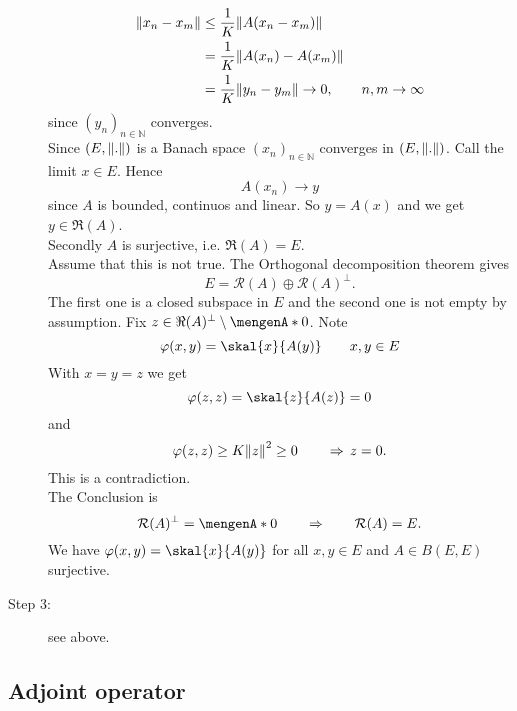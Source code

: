 \begin{beweis}
\begin{description}
		\begin{align*}
			\norm{x_n-x_m} &\leq \frac{1}{K} \norm{A(x_n-x_m)} \\
			&= \frac{1}{K} \norm{A(x_n)- A(x_m)} \\
			&= \frac{1}{K} \norm{y_n -y_m} \to 0, \qquad n,m \to \infty
		\end{align*}
		since $(y_n)_{n \in \mathbb{N}}$ converges. \\
		Since $(E, \norm{.})$ is a Banach space $(x_n)_{n \in \mathbb{N}}$ converges in $(E, \norm{.})$. Call the limit $x \in E$. Hence
		\[
			A(x_n) \to y
		\]
		since $A$ is bounded, continuos and linear. So $y = A(x)$ and we get $y \in \Re(A)$. \\
		Secondly $A$ is surjective, i.e. $\Re(A)=E$. \\
		Assume that this is not true. The Orthogonal decomposition theorem gives
		\[
			E = \mathcal{R}(A) \oplus \mathcal{R}(A)^{\perp}.
		\]
		The first one is a closed subspace in $E$ and the second one is not empty by assumption. Fix $z \in \Re(A)^{\perp} \setminus \set{0}$. Note 
		\[
			\varphi(x,y) = \skal{x}{A(y)} \qquad x,y \in E
		\]
		With $x = y = z$ we get
		\[
			\varphi(z,z) = \skal{z}{A(z)} = 0
		\]
		and 
		\[
			\varphi(z,z) \geq K \norm{z}^2 \geq 0 \qquad \Rightarrow  \,z=0.
		\]
		This is a contradiction. \\
		The Conclusion is 
		\[
			\mathcal{R}(A)^{\perp} = \set{0} \qquad \Rightarrow \qquad \mathcal{R}(A) = E.
		\]
		We have $\varphi(x,y) = \skal{x}{A(y)}$ for all $x,y \in E$ and $A \in B(E,E)$ surjective.
		\item[Step 3:] see above.
	\end{description}
\end{beweis}

\subsection{Adjoint operator} 
\label{sub:adjoint_operator}

